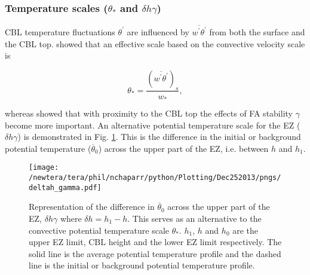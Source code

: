 

\subsubsection{Temperature scales ($\theta_{*}$ and $\delta h \gamma$)}
\label{subsubsec:tempscales}

CBL temperature fluctuations $\theta^{'}$ are influenced by $\overline{w^{'}\theta^{'}}$ from both the surface and the CBL top.
\cite{Deardorff70} showed that an effective scale based on the convective velocity scale is

\begin{equation}
\theta_{*} = \frac{(\overline{w^{'}\theta^{'}})_{s}}{w_{*}},
\end{equation} 

whereas \cite{Sorbjan1} showed that with proximity to the CBL top the effects of FA stability $\gamma$ become more important.  An alternative potential temperature scale for the EZ ($\delta h \gamma$) is demonstrated in Fig. \ref{fig:deltahgamma}. This is the difference in the initial or background potential temperature ($\overline{\theta}_{0}$) across the upper part of the EZ, i.e. between $h$ and $h_{1}$.      

\begin{figure}[htbp]
    \centering
    \texttt{[image: /newtera/tera/phil/nchaparr/python/Plotting/Dec252013/pngs/deltah\_gamma.pdf]}
    \caption[Alternative Potential Temperature Scale for the EZ]{Representation of the difference in $\overline{\theta}_{0}$ across the upper part of the EZ, $\delta h \gamma$ where $\delta h = h_{1} - h$. This serves as an alternative to the convective potential temperature scale $\theta_{*}$. $h_{1}$, $h$ and $h_{0}$ are the upper EZ limit, CBL height and the lower EZ limit respectively. The solid line is the average potential temperature profile and the dashed line is the initial or background potential temperature profile.}
    \label{fig:deltahgamma}   %
\end{figure}

